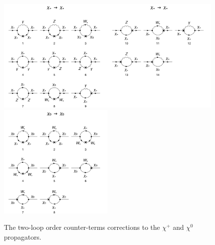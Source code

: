 \documentclass[11pt]{article}
\begin{document}
\begin{figure}[h!]
\center
\includegraphics[width=0.5\textwidth]{diagrams_F[1]_2c_1.pdf}\includegraphics[width=0.5\textwidth]{diagrams_F[1]_2c_2.pdf}
\includegraphics[width=0.5\textwidth]{diagrams_F[2]_2c.pdf}
\caption{The two-loop order counter-terms corrections to the $\chi^+$ and $\chi^0$ propagators.}\label{fig:chi_ct2}
\end{figure}
\end{document}
